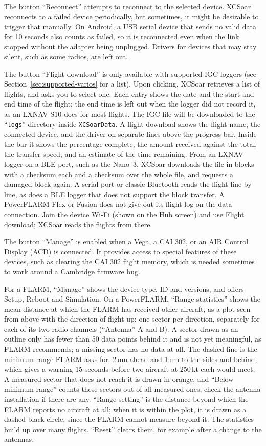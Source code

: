 The button ``Reconnect'' attempts to reconnect to the selected
device.  XCSoar reconnects to a failed device periodically, but
sometimes, it might be desirable to trigger that manually.  On
Android, a USB serial device that sends no valid data for 10 seconds
also counts as failed, so it is reconnected even when the link stopped
without the adapter being unplugged.  Drivers for devices that may
stay silent, such as some radios, are left out.

The button ``Flight download'' is only available with supported IGC
loggers (see Section~\ref{sec:supported-varios} for a list).  Upon clicking,
XCSoar retrieves a list of flights, and asks you to select one.  Each
entry shows the date and the start and end time of the flight; the end
time is left out when the logger did not record it, as an LXNAV S10
does for most flights.  The
IGC file will be downloaded to the ``\texttt{logs}'' directory inside
\texttt{XCSoarData}.  A flight download shows the flight name, the connected device, and the
driver on separate lines above the progress bar.  Inside the bar it
shows the percentage complete, the amount received against the total,
the transfer speed, and an estimate of the time remaining.
From an LXNAV logger on a BLE port, such as the Nano~3, XCSoar
downloads the file in blocks with a checksum each and a checksum over
the whole file, and requests a damaged block again.  A serial port or
classic Bluetooth reads the flight line by line, as does a BLE logger
that does not support the block transfer.
A PowerFLARM Flex or Fusion does not give out its flight log on the
data connection.  Join the device Wi-Fi (shown on the Hub screen) and
use Flight download; XCSoar reads the flights from there.

The button ``Manage'' is enabled when a Vega, a CAI 302, or an AIR Control
Display (ACD) is connected.  It provides access to special features of
these devices, such as clearing the CAI 302 flight memory, which is needed
sometimes to work around a Cambridge firmware bug.

For a FLARM, ``Manage'' shows the device type, ID and versions, and
offers Setup, Reboot and Simulation.  On a PowerFLARM, ``Range
statistics'' shows the mean distance at which the FLARM has received
other aircraft, as a plot seen from above with the direction of flight
up: one sector per direction, separately for each of its two radio
channels (``Antenna'' A and B).  A sector drawn as an outline only has
fewer than 50 data points behind it and is not yet meaningful, as
FLARM recommends; a missing sector has no data at all.  The dashed
line is the minimum range FLARM asks for: 2\,nm ahead and 1\,nm to
the sides and behind, which gives a warning 15 seconds before two
aircraft at 250\,kt each would meet.  A measured sector that does not
reach it is drawn in orange, and ``Below minimum range'' counts these
sectors out of all measured ones; check the antenna installation if
there are any.  ``Range setting'' is the distance beyond which the
FLARM reports no aircraft at all; when it is within the plot, it is
drawn as a dashed black circle, since the FLARM cannot measure beyond
it.  The statistics build up over many flights.  ``Reset''
clears them, for example after a change to the antennas.

